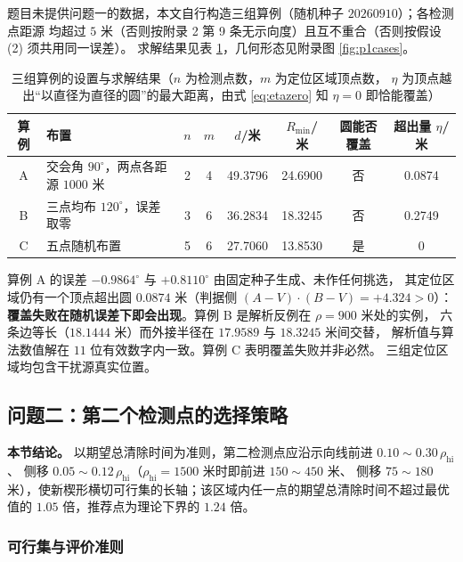 \documentclass[withoutpreface, bwprint]{cumcmthesis}
\begin{document}
题目未提供问题一的数据，本文自行构造三组算例（随机种子 $20260910$）；各检测点距源
均超过 $5$ 米（否则按附录 2 第 9 条无示向度）且互不重合（否则按假设 (2) 须共用同一误差）。
求解结果见表 \ref{tab:p1result}，几何形态见附录图 \ref{fig:p1cases}。

\begin{table}[H]
  \centering
  \caption{三组算例的设置与求解结果（$n$ 为检测点数，$m$ 为定位区域顶点数，
    $\eta$ 为顶点越出“以直径为直径的圆”的最大距离，由式 \eqref{eq:etazero} 知 $\eta=0$ 即恰能覆盖）}
  \label{tab:p1result}
  \footnotesize
  \begin{tabularx}{\textwidth}{cXcccccc}
    \toprule
    算例 & 布置 & $n$ & $m$ & $d$/米 & $R_{\min}$/米 & 圆能否覆盖 & 超出量 $\eta$/米 \\
    \midrule
    A & 交会角 $90^\circ$，两点各距源 $1000$ 米 & 2 & 4 & 49.3796 & 24.6900 & 否 & 0.0874 \\
    B & 三点均布 $120^\circ$，误差取零 & 3 & 6 & 36.2834 & 18.3245 & 否 & 0.2749 \\
    C & 五点随机布置 & 5 & 6 & 27.7060 & 13.8530 & 是 & 0 \\
    \bottomrule
  \end{tabularx}
\end{table}

算例 A 的误差 $-0.9864^\circ$ 与 $+0.8110^\circ$ 由固定种子生成、未作任何挑选，
其定位区域仍有一个顶点超出圆 $0.0874$ 米（判据侧 $(A-V)\cdot(B-V)=+4.324>0$）：
\textbf{覆盖失败在随机误差下即会出现}。算例 B 是解析反例在 $\rho=900$ 米处的实例，
六条边等长（$18.1444$ 米）而外接半径在 $17.9589$ 与 $18.3245$ 米间交替，
解析值与算法数值解在 $11$ 位有效数字内一致。算例 C 表明覆盖失败并非必然。
三组定位区域均包含干扰源真实位置。

\subsection{问题二：第二个检测点的选择策略}
\label{sec:p2}

\textbf{本节结论。} 以期望总清除时间为准则，第二检测点应沿示向线前进 $0.10\sim0.30\,\rho_{\mathrm{hi}}$、
侧移 $0.05\sim0.12\,\rho_{\mathrm{hi}}$（$\rho_{\mathrm{hi}}=1500$ 米时即前进 $150\sim450$ 米、
侧移 $75\sim180$ 米），使新楔形横切可行集的长轴；该区域内任一点的期望总清除时间不超过最优值的
$1.05$ 倍，推荐点为理论下界的 $1.24$ 倍。

\subsubsection{可行集与评价准则}
\label{sec:p2set}
\end{document}
